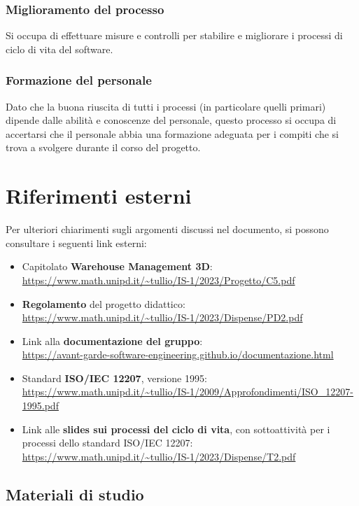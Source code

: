 \subsubsection{Miglioramento del processo}
Si occupa di effettuare misure e controlli per stabilire e migliorare i processi di ciclo di vita del software.
\subsubsection{Formazione del personale}
Dato che la buona riuscita di tutti i processi (in particolare quelli primari) dipende dalle abilità e conoscenze del personale, questo processo si occupa di accertarsi che il personale abbia una formazione adeguata per i compiti che si trova a svolgere durante il corso del progetto.

\newpage
\newpage
\section{Riferimenti esterni}\label{sec:riferimenti_esterni}
Per ulteriori chiarimenti sugli argomenti discussi nel documento, si possono consultare i seguenti link esterni:
\begin{itemize}
    \item Capitolato \textbf{Warehouse Management 3D}:\\
    \url{https://www.math.unipd.it/~tullio/IS-1/2023/Progetto/C5.pdf}
    \item \textbf{Regolamento} del progetto didattico:\\
    \url{https://www.math.unipd.it/~tullio/IS-1/2023/Dispense/PD2.pdf}
    \item Link alla \textbf{documentazione del gruppo}:\\
    \url{https://avant-garde-software-engineering.github.io/documentazione.html}
    \item Standard \textbf{ISO/IEC 12207}, versione 1995:\\
    \url{https://www.math.unipd.it/~tullio/IS-1/2009/Approfondimenti/ISO_12207-1995.pdf}
    \item Link alle \textbf{slides sui processi del ciclo di vita}, con sottoattività per i processi dello standard ISO/IEC 12207:\\
    \url{https://www.math.unipd.it/~tullio/IS-1/2023/Dispense/T2.pdf}
\end{itemize}
\subsection{Materiali di studio}\label{sec:riferimenti_esterni:materiali_di_studio}
